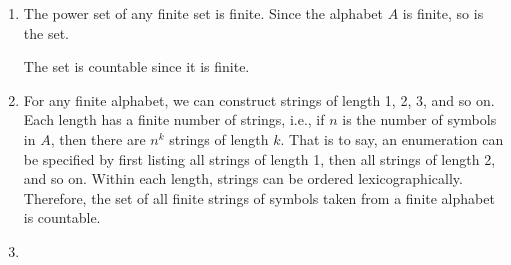 \begin{enumerate}[label=\alph*)]
\item
The power set of any finite set is finite. Since the alphabet $A$ is finite, so is the set.

The set is countable since it is finite.

\item
For any finite alphabet, we can construct strings of length 1, 2, 3, and so on. Each length has a finite number of strings, i.e., if $n$ is the number of symbols in $A$, then there are $n^k$ strings of length $k$. That is to say, an enumeration can be specified by first listing all strings of length 1, then all strings of length 2, and so on. Within each length, strings can be ordered lexicographically. Therefore, the set of all finite strings of symbols taken from a finite alphabet is countable.

\item


\end{enumerate}